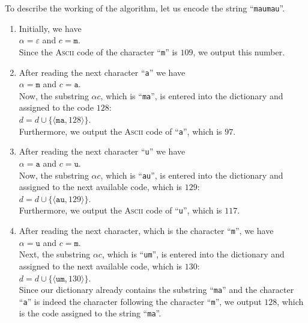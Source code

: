 To describe the working of the algorithm, let us encode the string ``\texttt{maumau}''.
\begin{enumerate}
\item Initially, we have
      \\[0.2cm]
      \hspace*{1.3cm}
      $\alpha = \varepsilon$ \quad and \quad $c = \mathtt{m}$.
      \\[0.2cm]
      Since the \textsc{Ascii} code of the character ``\texttt{m}'' is $109$, we output this number.
\item After reading the next character ``\texttt{a}'' we have
      \\[0.2cm]
      \hspace*{1.3cm}
      $\alpha = \mathtt{m}$ \quad and \quad $c = \mathtt{a}$.
      \\[0.2cm]
      Now, the substring $\alpha c$, which is ``\texttt{ma}'', is entered into the dictionary and
      assigned to the code $128$:
      \\[0.2cm]
      \hspace*{1.3cm}
      $d = d \cup \{\langle \mathtt{ma}, 128 \rangle\}$.
      \\[0.2cm]
      Furthermore, we output the \textsc{Ascii} code of ``\texttt{a}'', which is $97$.
\item After reading the next character ``\texttt{u}'' we have
      \\[0.2cm]
      \hspace*{1.3cm}
      $\alpha = \mathtt{a}$ \quad and \quad $c = \mathtt{u}$.
      \\[0.2cm]
      Now, the substring $\alpha c$, which is ``\texttt{au}'', is entered into the dictionary and
      assigned to the next available code, which is $129$:
      \\[0.2cm]
      \hspace*{1.3cm}
      $d = d \cup \{\langle \mathtt{au}, 129 \rangle\}$.
      \\[0.2cm]
      Furthermore, we output the \textsc{Ascii} code of ``\texttt{u}'', which is $117$.
\item After reading the next character, which is the character ``\texttt{m}'', we have
      \\[0.2cm]
      \hspace*{1.3cm}
      $\alpha = \mathtt{u}$ \quad and \quad $c = \mathtt{m}$.
      \\[0.2cm]
      Next, the substring $\alpha c$, which is ``\texttt{um}'', is entered into the dictionary and
      assigned to the next available code, which is $130$:
      \\[0.2cm]
      \hspace*{1.3cm}
      $d = d \cup \{\langle \mathtt{um}, 130 \rangle\}$.
      \\[0.2cm]
      Since our dictionary already contains the substring ``\texttt{ma}'' and the character
      ``\texttt{a}'' is indeed the character following the character ``\texttt{m}'', we output
      $128$, which is the code assigned to the string ``\texttt{ma}''.


\end{enumerate}

